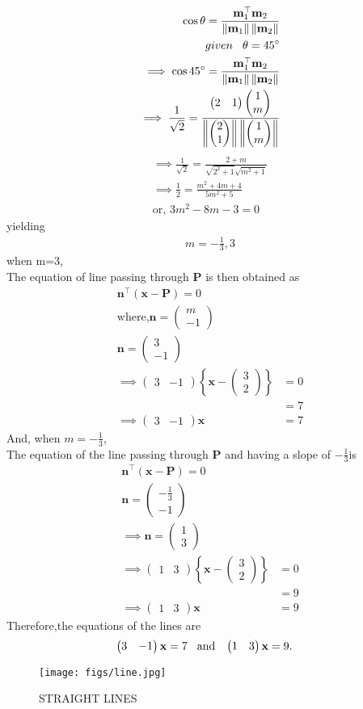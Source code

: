 \documentclass[10pt,a4paper]{report}
\newcommand{\myvec}[1]{\ensuremath{\begin{pmatrix}#1\end{pmatrix}}}
\let\vec\mathbf
\providecommand{\cbrak}[1]{\ensuremath{\left\{#1\right\}}}
\providecommand{\norm}[1]{\left\lVert#1\right\rVert}
\let\vec\mathbf
\renewcommand{\vec}[1]{\textbf{#1}}
\begin{document}
\begin{align}
\cos \theta = \frac{\vec{m}_1^\top \vec{m}_2}{\norm{\vec{m}_1}\norm{\vec{m}_2}}\\
given\hspace{0.3cm}  \theta = 45^\circ\\
\implies \cos45^\circ =  \frac{\vec{m}_1^\top \vec{m}_2}{\norm{\vec{m}_1}\norm{\vec{m}_2}}\\
\implies \frac{1}{\sqrt{2}} = \frac{\myvec{2 & 1} \myvec{1\\m}}{\norm{\myvec{2\\1}}\norm{\myvec{1\\m}}}
\end{align}
\begin{align}
\implies \frac{1}{\sqrt{2}}=\frac{2+m}{\sqrt{2^2 + 1}\sqrt{m^2 + 1}}\\
\implies \frac{1}{2}=\frac{m^2 + 4m +4}{5m^2 +5}\\
\text{or, } 3m^2 - 8m -3 = 0
\end{align}
yielding
\begin{align}
m= - \frac{1}{3}, 3
\end{align} 
when m=3,\\
The equation of line passing through $\vec{P}$  is then obtained as
\begin{align}
\vec{n}^{\top} ({\vec{x}-\vec{P}}) = 0\\
\text{where,}{\vec{n}}=\myvec{m\\-1} \\
{\vec{n}}=\myvec{3\\-1} \\
\implies 
	\myvec{3&-1}\cbrak{\vec{x}-\myvec{3\\2}}&=0\\
	&=7 \\
 \implies 	\myvec{3 & -1}\vec{x} &= 7
\end{align}
And, when $m=-\frac{1}{3}$,\\
The equation of the line passing through $\vec{P}$  and having a slope of $-\frac{1}{3}$is
\begin{align}
\vec{n}^{\top} ({\vec{x}-\vec{P}}) = 0\\
{\vec{n}}=\myvec{-\frac{1}{3}\\-1} \\
\implies {\vec{n}}=\myvec{1\\3} \\
\implies 
	\myvec{1&3}\cbrak{\vec{x}-\myvec{3\\2}}&=0\\
	&=9 \\
		\implies 	\myvec{1 & 3}\vec{x} &= 9
\end{align}
Therefore,the equations of the lines are 
\begin{align}
	\myvec{3 & -1}\vec{x} &= 7  \hspace{0.3cm}\text{and}\hspace{0.3cm} \myvec{1 & 3}\vec{x} = 9 .
\end{align}
\begin{figure}[H]
\centering
\texttt{[image: figs/line.jpg]}
\caption{STRAIGHT LINES}
\label{fig:line.jpg}
\end{figure}
\end{document}
